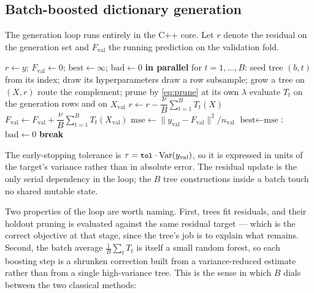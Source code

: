 \documentclass[11pt,a4paper]{article}
\newcommand{\code}[1]{\texttt{\small #1}}
\DeclareMathOperator{\Var}{Var}
\theoremstyle{definition}
\begin{document}
\subsection{Batch-boosted dictionary generation}\label{sec:boost}

The generation loop runs entirely in the C++ core. Let $r$ denote the residual
on the generation set and $F_{\text{val}}$ the running prediction on the
validation fold.

\begin{algorithm}[H]
\caption{Batch boosting (\code{Ensemble::boost})}
\begin{algorithmic}[1]
\State $r \gets y$; \quad $F_{\text{val}} \gets 0$; \quad
$\text{best} \gets \infty$; \quad $\text{bad} \gets 0$
\For{$b = 1, \dots, \code{max\_iter}$}
  \State \textbf{in parallel} for $t = 1, \dots, B$:
  \Statex \hspace{2em} seed tree $(b,t)$ from its index; draw its hyperparameters
  \Statex \hspace{2em} draw a row subsample; grow a tree on $(X, r)$
  \Statex \hspace{2em} route the complement; prune by \eqref{eq:prune} at its own $\lambda$
  \Statex \hspace{2em} evaluate $T_t$ on the generation rows and on $X_{\text{val}}$
  \State $r \gets r - \dfrac{\nu}{B}\displaystyle\sum_{t=1}^{B} T_t(X)$
  \State $F_{\text{val}} \gets F_{\text{val}} + \dfrac{\nu}{B}\displaystyle\sum_{t=1}^{B} T_t(X_{\text{val}})$
  \State $\text{mse} \gets \|y_{\text{val}} - F_{\text{val}}\|^2 / n_{\text{val}}$
   $\text{best} \gets \text{mse}$;\ $\text{bad} \gets 0$
  \ElsIf{$\texttt{++bad} \ge \code{n\_iter\_no\_change}$} \textbf{break}
  \EndIf
\EndFor
\end{algorithmic}
\end{algorithm}

The early-stopping tolerance is $\tau = \code{tol} \cdot \Var(y_{\text{val}})$,
so it is expressed in units of the target's variance rather than in absolute
error. The residual update is the only serial dependency in the loop; the $B$
tree constructions inside a batch touch no shared mutable state.

Two properties of the loop are worth naming. First, trees fit residuals, and
their holdout pruning is evaluated against the same residual target --- which
is the correct objective at that stage, since the tree's job is to explain
what remains. Second, the batch average $\frac{1}{B}\sum_t T_t$ is itself a
small random forest, so each boosting step is a shrunken correction built from
a variance-reduced estimate rather than from a single high-variance tree. This
is the sense in which $B$ dials between the two classical methods:
\end{document}
